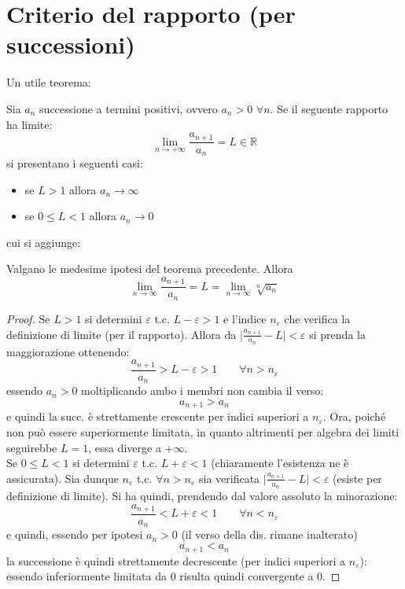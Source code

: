 \documentclass[10pt, oneside]{book}
\theoremstyle{plain}
\begin{document}
\section{Criterio del rapporto (per successioni)}
Un utile teorema:
\begin{ther}
    Sia $a_n$ successione a termini positivi, ovvero $a_n > 0$ $\forall n$. Se il seguente rapporto ha limite:
    \[\lim\limits_{n \rightarrow +\infty} \frac{a_{n+1}}{a_n} = L \in \mathbb{R}\]
    si presentano i seguenti casi:
    \begin{itemize}
        \item se $L > 1$ allora $a_n \rightarrow \infty$
        \item se $0 \leq L < 1$ allora $a_n \rightarrow 0$
    \end{itemize}
\end{ther}
cui si aggiunge:
\begin{ther}
    Valgano le medesime ipotesi del teorema precedente. Allora
    \[\lim \limits_{n \rightarrow \infty}\frac{a_{n+1}}{a_n} = L = \lim \limits_{n \rightarrow \infty} \sqrt[n]{a_n}\]
\end{ther}
\begin{proof}
Se $L > 1$ si determini $\varepsilon$ t.c. $L - \varepsilon > 1$ e l'indice $n_\varepsilon$ che verifica la definizione di limite (per il rapporto). Allora da $\displaystyle \big| \frac{a_{n+1}}{a_n} - L \big| < \varepsilon$ si prenda la maggiorazione ottenendo:
\[\frac{a_{n+1}}{a_n} > L - \varepsilon > 1 \qquad \forall n > n_\varepsilon\]
essendo $a_n > 0$ moltiplicando ambo i membri non cambia il verso:
\[a_{n+1} > a_n\]
e quindi la succ. è strettamente crescente per indici superiori a $n_\varepsilon$. Ora, poiché non può essere superiormente limitata, in quanto altrimenti per algebra dei limiti seguirebbe $L = 1$, essa diverge a $+\infty$.
\\
Se $0 \leq L < 1$ si determini $\varepsilon$ t.c. $L + \varepsilon < 1$ (chiaramente l'esistenza ne è assicurata). Sia dunque $n_\varepsilon$ t.c. $\forall n > n_\varepsilon$ sia verificata $\displaystyle \big| \frac{a_{n+1}}{a_n} - L \big| < \varepsilon$ (esiste per definizione di limite). Si ha quindi, prendendo dal valore assoluto la minorazione:
\[\frac{a_{n+1}}{a_n} < L + \varepsilon < 1 \qquad \forall n < n_\varepsilon\]
e quindi, essendo per ipotesi $a_n > 0$ (il verso della dis. rimane inalterato)
\[a_{n+1} < a_n\]
la successione è quindi strettamente decrescente (per indici superiori a $n_\varepsilon$): essendo inferiormente limitata da $0$ risulta quindi convergente a $0$.
\end{proof}
\end{document}

